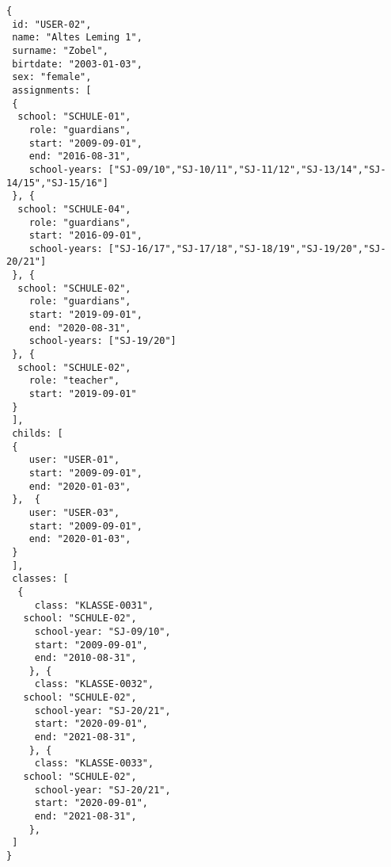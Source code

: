 
\begin{lstlisting}[caption={Beispiel für Benutzer mit Rollen 'teachers' und 'guardians'},frame=tlrb]
{
 id: "USER-02",
 name: "Altes Leming 1",
 surname: "Zobel",
 birtdate: "2003-01-03",
 sex: "female",
 assignments: [
 {
  school: "SCHULE-01",
	role: "guardians",
	start: "2009-09-01",
	end: "2016-08-31",
	school-years: ["SJ-09/10","SJ-10/11","SJ-11/12","SJ-13/14","SJ-14/15","SJ-15/16"]
 }, {
  school: "SCHULE-04",
	role: "guardians",
	start: "2016-09-01",
	school-years: ["SJ-16/17","SJ-17/18","SJ-18/19","SJ-19/20","SJ-20/21"]
 }, {
  school: "SCHULE-02",
	role: "guardians",
	start: "2019-09-01",
	end: "2020-08-31",
	school-years: ["SJ-19/20"]
 }, {
  school: "SCHULE-02",
	role: "teacher",
	start: "2019-09-01"
 }
 ],
 childs: [
 {
	user: "USER-01",
	start: "2009-09-01",
	end: "2020-01-03",
 },  {
	user: "USER-03",
	start: "2009-09-01",
	end: "2020-01-03",
 }
 ],
 classes: [
  {
	 class: "KLASSE-0031",
   school: "SCHULE-02",
	 school-year: "SJ-09/10",
	 start: "2009-09-01",
	 end: "2010-08-31",
	}, {
	 class: "KLASSE-0032",
   school: "SCHULE-02",
	 school-year: "SJ-20/21",
	 start: "2020-09-01",
	 end: "2021-08-31",
	}, {
	 class: "KLASSE-0033",
   school: "SCHULE-02",
	 school-year: "SJ-20/21",
	 start: "2020-09-01",
	 end: "2021-08-31",
	}, 
 ]
}
\end{lstlisting}
